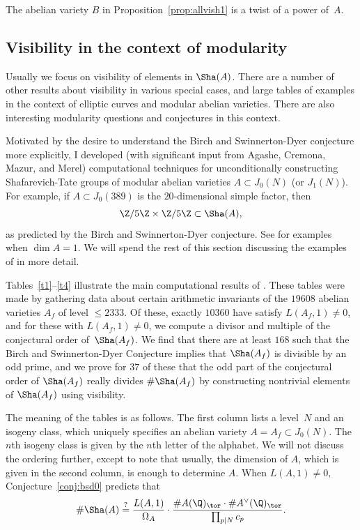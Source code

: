 \documentclass{report}
\begin{document}
\begin{remark}
  The abelian variety $B$ in Proposition~\ref{prop:allvish1} is a
  twist of a power of~$A$.
\end{remark}

\subsection{Visibility in the context of modularity}
Usually we focus on visibility of elements in $\Sha(A)$.  There are a
number of other results about visibility in various special cases, and
large tables of examples in the context of elliptic curves and modular
abelian varieties.  There are also interesting modularity questions
and conjectures in this context.

Motivated by the desire to understand the Birch and Swinnerton-Dyer
conjecture more explicitly, I developed  (with
significant input from Agashe, Cremona, Mazur, and Merel)
computational techniques for unconditionally constructing
Shafarevich-Tate groups of modular abelian varieties $A\subset J_0(N)$
(or $J_1(N)$).  For example, if $A\subset J_0(389)$ is the
$20$-dimensional simple factor, then
\[
  \Z/5\Z\times \Z/5\Z\subset \Sha(A),
\]
as predicted by the Birch and Swinnerton-Dyer conjecture.  See
\cite{cremona-mazur} for examples when $\dim A=1$.  We will spend the
rest of this section discussing the examples of
\cite{agashe-stein:bsd, agashe-stein:visibility} in more detail.

Tables~\ref{t1}--\ref{t4} illustrate the main computational results of
\cite{agashe-stein:bsd}.  These tables were made by gathering data
about certain arithmetic invariants of the $19608$ abelian varieties
$A_f$ of level $\leq 2333$.  Of these, exactly $10360$ have satisfy
$L(A_f,1)\neq 0$, and for these with $L(A_f,1)\neq 0$, we compute a
divisor and multiple of the conjectural order of~$\Sha(A_f)$.  We find
that there are at least $168$ such that the Birch and Swinnerton-Dyer
Conjecture implies that $\Sha(A_f)$ is divisible by an odd prime, and
we prove for $37$ of these that the odd part of the conjectural order
of $\Sha(A_f)$ really divides $\#\Sha(A_f)$ by constructing nontrivial
elements of $\Sha(A_f)$ using visibility.

The meaning of the tables is as follows.  The first column lists a
level~$N$ and an isogeny class, which uniquely specifies an abelian
variety $A=A_f\subset J_0(N)$.  The $n$th isogeny class is given by
the $n$th letter of the alphabet. We will not discuss the ordering
further, except to note that usually, the dimension of $A$, which is
given in the second column, is enough to determine $A$.  When
$L(A,1)\neq 0$, Conjecture~\ref{conj:bsd0} predicts that
$$
\#\Sha(A) \stackrel{?}{=}
\frac{L(A,1)}{\Omega_A}\cdot\frac{\#A(\Q)_{\tor}
\cdot \#A^{\vee}(\Q)_{\tor}}{\prod_{p\mid N} c_p}.
$$
\renewcommand{\ab}{A\cap B}
\newcommand{\mdeg}{\text{odd}\deg(\vphi_A)}
\end{document}
